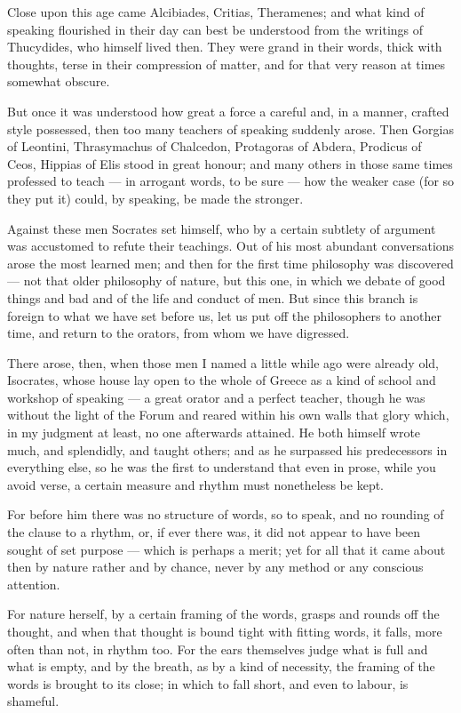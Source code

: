  Close upon this age came Alcibiades, Critias, Theramenes; and what kind of speaking flourished in their day can best be understood from the writings of Thucydides, who himself lived then. They were grand in their words, thick with thoughts, terse in their compression of matter, and for that very reason at times somewhat obscure.

 But once it was understood how great a force a careful and, in a manner, crafted style possessed, then too many teachers of speaking suddenly arose. Then Gorgias of Leontini, Thrasymachus of Chalcedon, Protagoras of Abdera, Prodicus of Ceos, Hippias of Elis stood in great honour; and many others in those same times professed to teach — in arrogant words, to be sure — how the weaker case (for so they put it) could, by speaking, be made the stronger.

 Against these men Socrates set himself, who by a certain subtlety of argument was accustomed to refute their teachings. Out of his most abundant conversations arose the most learned men; and then for the first time philosophy was discovered — not that older philosophy of nature, but this one, in which we debate of good things and bad and of the life and conduct of men. But since this branch is foreign to what we have set before us, let us put off the philosophers to another time, and return to the orators, from whom we have digressed.

 There arose, then, when those men I named a little while ago were already old, Isocrates, whose house lay open to the whole of Greece as a kind of school and workshop of speaking — a great orator and a perfect teacher, though he was without the light of the Forum and reared within his own walls that glory which, in my judgment at least, no one afterwards attained. He both himself wrote much, and splendidly, and taught others; and as he surpassed his predecessors in everything else, so he was the first to understand that even in prose, while you avoid verse, a certain measure and rhythm must nonetheless be kept.

 For before him there was no structure of words, so to speak, and no rounding of the clause to a rhythm, or, if ever there was, it did not appear to have been sought of set purpose — which is perhaps a merit; yet for all that it came about then by nature rather and by chance, never by any method or any conscious attention.

 For nature herself, by a certain framing of the words, grasps and rounds off the thought, and when that thought is bound tight with fitting words, it falls, more often than not, in rhythm too. For the ears themselves judge what is full and what is empty, and by the breath, as by a kind of necessity, the framing of the words is brought to its close; in which to fall short, and even to labour, is shameful.

